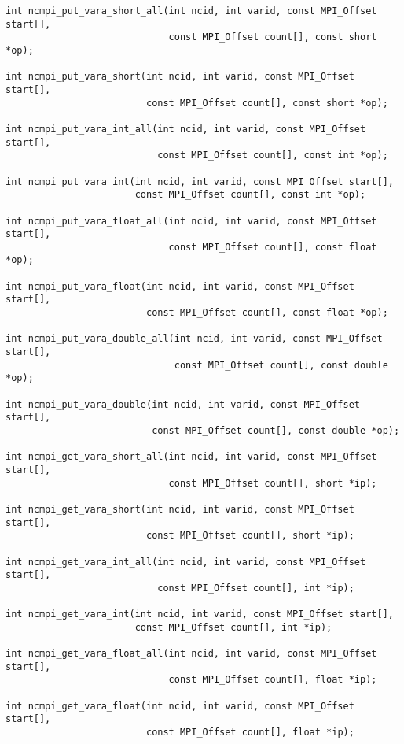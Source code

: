 \documentclass[10pt]{article}
\begin{document}
\begin{verbatim}
int ncmpi_put_vara_short_all(int ncid, int varid, const MPI_Offset start[],
                             const MPI_Offset count[], const short *op);

int ncmpi_put_vara_short(int ncid, int varid, const MPI_Offset start[], 
                         const MPI_Offset count[], const short *op);

int ncmpi_put_vara_int_all(int ncid, int varid, const MPI_Offset start[],
                           const MPI_Offset count[], const int *op);

int ncmpi_put_vara_int(int ncid, int varid, const MPI_Offset start[],
                       const MPI_Offset count[], const int *op);

int ncmpi_put_vara_float_all(int ncid, int varid, const MPI_Offset start[],
                             const MPI_Offset count[], const float *op);

int ncmpi_put_vara_float(int ncid, int varid, const MPI_Offset start[],
                         const MPI_Offset count[], const float *op);

int ncmpi_put_vara_double_all(int ncid, int varid, const MPI_Offset start[], 
                              const MPI_Offset count[], const double *op);

int ncmpi_put_vara_double(int ncid, int varid, const MPI_Offset start[],
                          const MPI_Offset count[], const double *op);

int ncmpi_get_vara_short_all(int ncid, int varid, const MPI_Offset start[],
                             const MPI_Offset count[], short *ip);

int ncmpi_get_vara_short(int ncid, int varid, const MPI_Offset start[],
                         const MPI_Offset count[], short *ip);

int ncmpi_get_vara_int_all(int ncid, int varid, const MPI_Offset start[],
                           const MPI_Offset count[], int *ip);

int ncmpi_get_vara_int(int ncid, int varid, const MPI_Offset start[],
                       const MPI_Offset count[], int *ip);

int ncmpi_get_vara_float_all(int ncid, int varid, const MPI_Offset start[],
                             const MPI_Offset count[], float *ip);

int ncmpi_get_vara_float(int ncid, int varid, const MPI_Offset start[],
                         const MPI_Offset count[], float *ip);


\end{verbatim}
\end{document}
